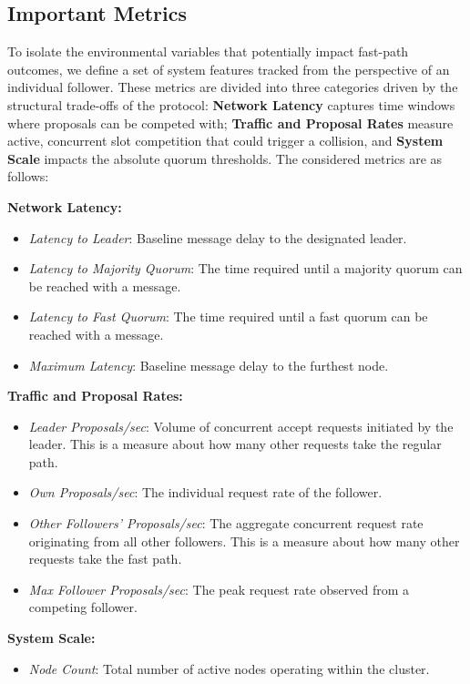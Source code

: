 \subsection{Important Metrics}
To isolate the environmental variables that potentially impact fast-path outcomes, we define a set of system features tracked from the perspective of an individual follower. These metrics are divided into three categories driven by the structural trade-offs of the protocol: \textbf{Network Latency} captures time windows where proposals can be competed with; \textbf{Traffic and Proposal Rates} measure active, concurrent slot competition that could trigger a collision, and \textbf{System Scale} impacts the absolute quorum thresholds. The considered metrics are as follows:

\vspace{1em}
\noindent\textbf{Network Latency:}
\begin{itemize}
    \item \textit{Latency to Leader}: Baseline message delay to the designated leader.
    \item \textit{Latency to Majority Quorum}: The time required until a majority quorum can be reached with a message.
    \item \textit{Latency to Fast Quorum}: The time required until a fast quorum can be reached with a message.
    \item \textit{Maximum Latency}: Baseline message delay to the furthest node.
\end{itemize}

\noindent\textbf{Traffic and Proposal Rates:}
\begin{itemize}
    \item \textit{Leader Proposals/sec}: Volume of concurrent accept requests initiated by the leader. This is a measure about how many other requests take the regular path.
    \item \textit{Own Proposals/sec}: The individual request rate of the follower.
    \item \textit{Other Followers' Proposals/sec}: The aggregate concurrent request rate originating from all other followers. This is a measure about how many other requests take the fast path.
    \item \textit{Max Follower Proposals/sec}: The peak request rate observed from a competing follower.
\end{itemize}

\noindent\textbf{System Scale:}
\begin{itemize}
    \item \textit{Node Count}: Total number of active nodes operating within the  cluster.
\end{itemize}

